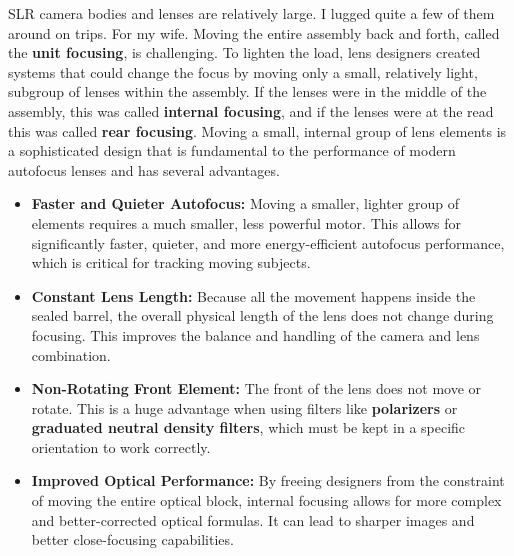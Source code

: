 \documentclass[
  letterpaper,
]{book}
\providecommand{\tightlist}{%
  \setlength{\itemsep}{0pt}\setlength{\parskip}{0pt}}\usepackage{longtable,booktabs,array}
\begin{document}
SLR camera bodies and lenses are relatively large. I lugged quite a few
of them around on trips. For my wife. Moving the entire assembly back
and forth, called the \textbf{unit focusing}, is challenging. To lighten
the load, lens designers created systems that could change the focus by
moving only a small, relatively light, subgroup of lenses within the
assembly. If the lenses were in the middle of the assembly, this was
called \textbf{internal focusing}, and if the lenses were at the read
this was called \textbf{rear focusing}. Moving a small, internal group
of lens elements is a sophisticated design that is fundamental to the
performance of modern autofocus lenses and has several advantages.

\begin{itemize}
\tightlist
\item
  \textbf{Faster and Quieter Autofocus:} Moving a smaller, lighter group
  of elements requires a much smaller, less powerful motor. This allows
  for significantly faster, quieter, and more energy-efficient autofocus
  performance, which is critical for tracking moving subjects.
\item
  \textbf{Constant Lens Length:} Because all the movement happens inside
  the sealed barrel, the overall physical length of the lens does not
  change during focusing. This improves the balance and handling of the
  camera and lens combination.
\item
  \textbf{Non-Rotating Front Element:} The front of the lens does not
  move or rotate. This is a huge advantage when using filters like
  \textbf{polarizers} or \textbf{graduated neutral density filters},
  which must be kept in a specific orientation to work correctly.
\item
  \textbf{Improved Optical Performance:} By freeing designers from the
  constraint of moving the entire optical block, internal focusing
  allows for more complex and better-corrected optical formulas. It can
  lead to sharper images and better close-focusing capabilities.
\end{itemize}
\end{document}
